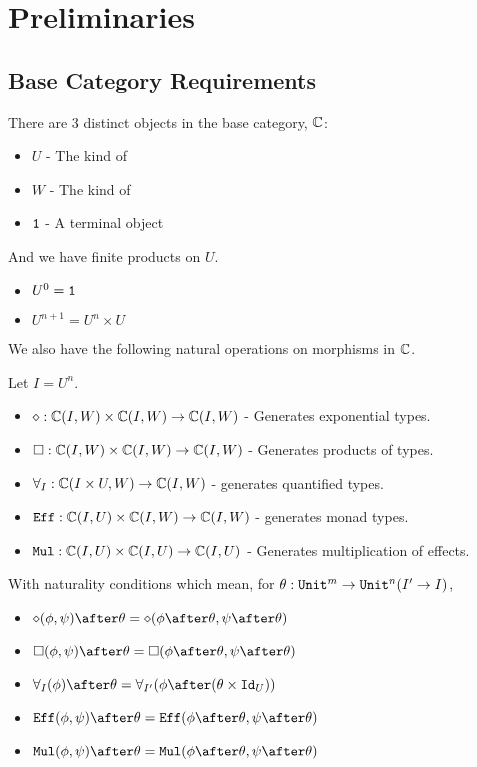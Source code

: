 \documentclass{report}
\begin{document}
\tableofcontents
\chapter{Preliminaries}
\section{Base Category Requirements}
There are 3 distinct objects in the base category, $\mathbb{C}$:

\begin{itemize}
    \item $U$ - The kind of \effect
    \item $W$ - The kind of \type
    \item $\texttt{1}$ - A terminal object
\end{itemize}

And we have finite products on $U$.

\begin{itemize}
    \item $U^0 = \texttt{1}$
    \item $U^{n+1} = U^n \times U$
\end{itemize}

We also have the following natural operations on morphisms in $\mathbb{C}$.

Let $I = U^n$.

\begin{itemize}
    \item $\diamond: \mathbb{C}(I, W) \times \mathbb{C}(I, W) \rightarrow \mathbb{C}(I, W)$ - Generates exponential types.
    \item $\square: \mathbb{C}(I, W)\times\mathbb{C}(I, W)\rightarrow\mathbb{C}(I, W)$ - Generates products of types.
    \item $\forall_I: \mathbb{C}(I\times U, W)\rightarrow\mathbb{C}(I, W)$ - generates quantified types.
    \item $\texttt{Eff}:\mathbb{C}(I, U)\times\mathbb{C}(I, W)\rightarrow\mathbb{C}(I, W)$ - generates monad types.
    \item $\texttt{Mul}:\mathbb{C}(I, U)\times\mathbb{C}(I, U)\rightarrow\mathbb{C}(I, U)$ - Generates multiplication of effects.
\end{itemize}

With naturality conditions which mean, for $\theta: \texttt{Unit}^m \rightarrow\texttt{Unit}^n (I' \rightarrow I)$,
\begin{itemize}
    \item $\diamond(\phi,\psi)\after\theta = \diamond(\phi\after\theta,\psi\after\theta)$
    \item $\square(\phi,\psi)\after\theta = \square(\phi\after\theta,\psi\after\theta)$
    \item $\allI(\phi)\after\theta = \allII(\phi\after(\theta\times\Id{U}))$
    \item $\Eff(\phi,\psi)\after\theta = \Eff(\phi\after\theta,\psi\after\theta)$
    \item $\Mul(\phi,\psi)\after\theta = \Mul(\phi\after\theta,\psi\after\theta)$
\end{itemize}
\end{document}
